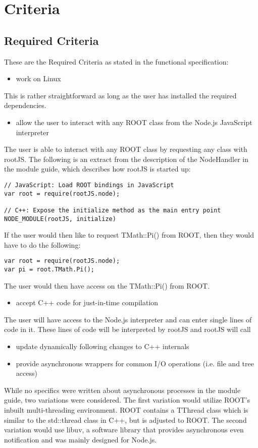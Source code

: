 \chapter{Criteria}
\section{Required Criteria}
These are the Required Criteria as stated in the functional specification:
\begin{itemize}
	\item work on Linux
\end{itemize}
	This is rather straightforward as long as the user has installed the required dependencies.
	
\begin{itemize}
	\item allow the user to interact with any ROOT class from the Node.js JavaScript interpreter
\end{itemize}
	The user is able to interact with any ROOT class by requesting any class with rootJS. The following is an extract from the description of the NodeHandler	in the module guide, which describes how rootJS is started up:
\begin{verbatim}
// JavaScript: Load ROOT bindings in JavaScript
var root = require(rootJS.node);

// C++: Expose the initialize method as the main entry point
NODE_MODULE(rootJS, initialize)
\end{verbatim}
	If the user would then like to request TMath::Pi() from ROOT, then they would have to do the following: 
\begin{verbatim}
var root = require(rootJS.node);
var pi = root.TMath.Pi();
\end{verbatim}
	The user would then have access on the TMath::Pi() from ROOT.
	
\begin{itemize}
	\item accept C++ code for just-in-time compilation
\end{itemize}
The user will have access to the Node.js interpreter and can enter single lines of code in it. 
These lines of code will be interpreted by rootJS and rootJS will call 

\begin{itemize}
	\item update dynamically following changes to C++ internals
\end{itemize}


\begin{itemize}
	\item provide asynchronous wrappers for common I/O operations (i.e. file and tree access)
\end{itemize}
While no specifics were written about asynchronous processes in the module guide, two variations were considered. The first variation would utilize ROOT's inbuilt 
multi-threading environment. ROOT contains a TThread class which is similar to the std::thread class in C++, but is adjusted to ROOT. 
The second variation would use libuv, a software library that provides asynchronous even notification and was mainly designed for Node.js. 

